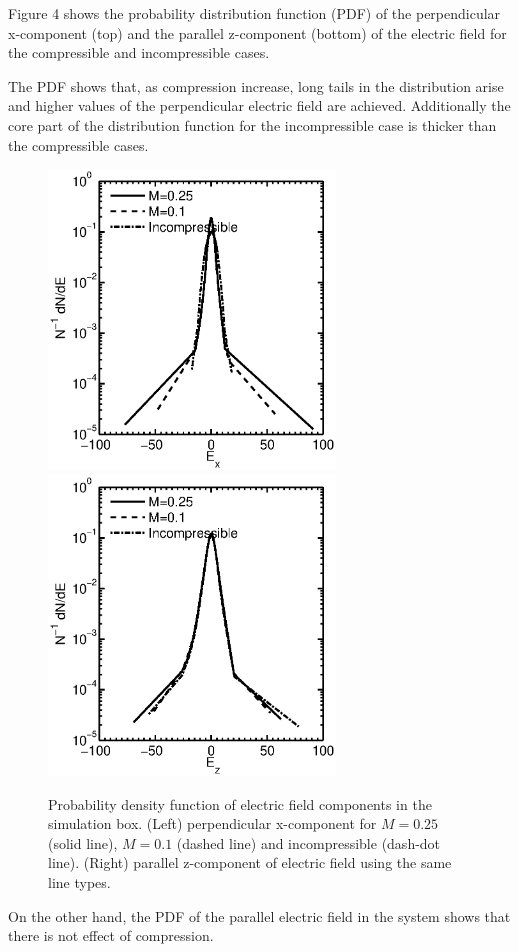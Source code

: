 \documentclass[%
aip,pop,amsmath,amssymb,
 reprint,%
]{revtex4-1}
\begin{document}
Figure 4 shows the probability distribution function (PDF) of the
perpendicular x-component (top) and the parallel z-component (bottom) 
of the electric field 
for the compressible and incompressible cases. 

The PDF shows that, as compression increase, long tails in the 
distribution arise and higher values of the perpendicular electric field 
are achieved.
Additionally the core part of the distribution function for the incompressible 
case is
thicker than the compressible cases.

\begin{figure}
\begin{center}
{\includegraphics[width = 3in]{./Figures/Fig4_b}}
{\includegraphics[width = 3in]{./Figures/Fig4_2}}
\caption{Probability density function of electric field components 
in the simulation box. 
(Left) perpendicular x-component 
for $M=0.25$ (solid line), $M=0.1$ (dashed line) and incompressible 
(dash-dot line). (Right) parallel z-component of electric field 
using the same line types.}
\end{center}
\label{mean square velocity}
\end{figure}
On the other hand, the PDF of the parallel electric field in the system shows 
that there is not
effect of compression.
\end{document}
